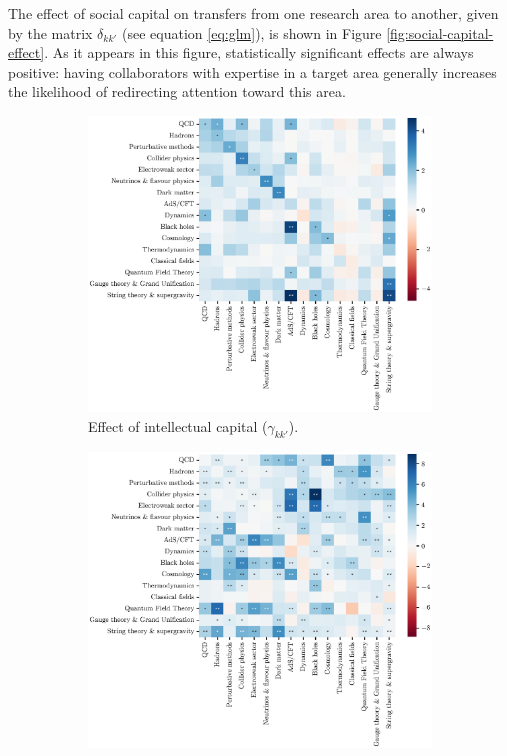 \documentclass{article}
\begin{document}
The effect of social capital on transfers from one research area to another, given by the matrix $\delta_{kk'}$ (see equation \ref{eq:glm}), is shown in Figure \ref{fig:social-capital-effect}. As it appears in this figure, statistically significant effects are always positive: having collaborators with expertise in a target area generally increases the likelihood of redirecting attention toward this area.


\begin{figure}[h]
\hspace{-2em}
\begin{subfigure}{.5\textwidth}
    \includegraphics[width=1\textwidth]{plots/ei_gamma_control_nu.eps}
    \caption{Effect of intellectual capital ($\gamma_{kk'}$).}
    \label{fig:intellectual-capital-effect}
\end{subfigure}%
\begin{subfigure}{.5\textwidth}
    \includegraphics[width=1\textwidth]{plots/ei_delta_control_nu.eps}

\end{subfigure}
\end{figure}
\end{document}
